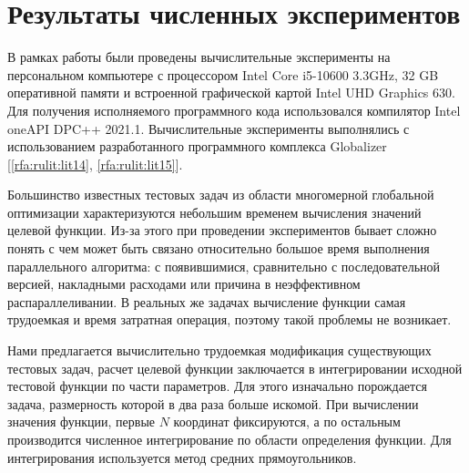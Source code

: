 \documentclass[10pt,a4paper]{book}
\begin{document}
\section{Результаты численных экспериментов}

В рамках работы были проведены вычислительные эксперименты на персональном компьютере с процессором Intel Core i5-10600 3.3GHz, 32 GB оперативной памяти и встроенной графической картой Intel UHD Graphics 630. Для получения исполняемого программного кода использовался компилятор Intel oneAPI DPC++ 2021.1. Вычислительные эксперименты выполнялись с использованием разработанного программного комплекса Globalizer [\ref{rfa:rulit:lit14}, \ref{rfa:rulit:lit15}].

Большинство известных тестовых задач из области многомерной глобальной оптимизации характеризуются небольшим временем вычисления значений целевой функции. Из-за этого при проведении экспериментов бывает сложно понять с чем может быть связано относительно большое время выполнения параллельного алгоритма: с появившимися, сравнительно с последовательной версией, накладными расходами или причина в неэффективном распараллеливании. В реальных же задачах вычисление функции самая трудоемкая и время затратная операция, поэтому такой проблемы не возникает. 

Нами предлагается вычислительно трудоемкая модификация существующих тестовых задач, расчет целевой функции заключается в интегрировании исходной тестовой функции по части параметров. Для этого изначально порождается задача, размерность которой в два раза больше искомой. При вычислении значения функции, первые $N$ координат фиксируются, а по остальным производится численное интегрирование по области определения функции. Для интегрирования используется метод средних прямоугольников. 
\end{document}
